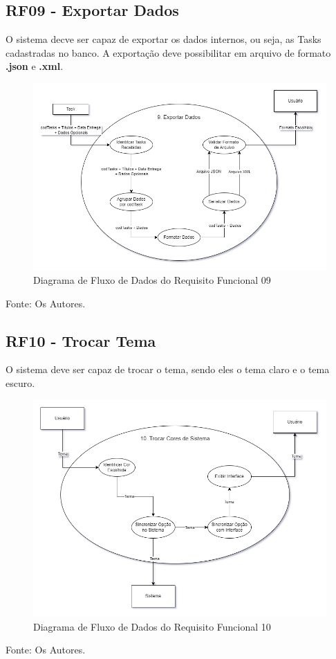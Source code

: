 \documentclass[a4paper,12pt]{article}
\begin{document}
\pagebreak
\subsection{RF09 - Exportar Dados}
O sistema decve ser capaz de exportar os dados internos, ou seja, as Tasks cadastradas no banco. A exportação deve possibilitar 
em arquivo de formato \textbf{.json} e \textbf{.xml}.
\begin{figure}[H]
	\centering
	\includegraphics[scale=0.45]{DFDs/RF09.drawio.png}
	\caption{Diagrama de Fluxo de Dados do Requisito Funcional 09}
\end{figure}
\noindent Fonte: Os Autores.

\pagebreak
\subsection{RF10 - Trocar Tema}
O sistema deve ser capaz de trocar o tema, sendo eles o tema claro e o tema escuro.
\begin{figure}[H]
	\centering
	\includegraphics[scale=0.45]{DFDs/RF10.drawio.png}
	\caption{Diagrama de Fluxo de Dados do Requisito Funcional 10}
\end{figure}
\noindent Fonte: Os Autores.
\end{document}
